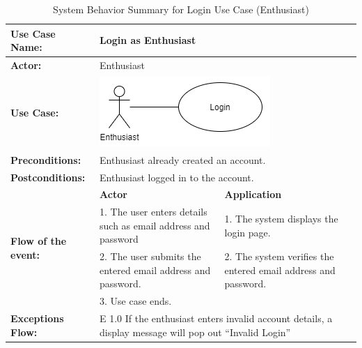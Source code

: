 \begin{longtable}{|p{3cm}|p{5cm}|p{5cm}|}
    \caption{\centering System Behavior Summary for Login Use Case (Enthusiast)} \\
    \hline
    \textbf{Use Case Name:} & \multicolumn{2}{l|}{Login as Enthusiast} \\ \hline
    \textbf{Actor:} & \multicolumn{2}{l|}{Enthusiast} \\ \hline
    \textbf{Use Case:} & \multicolumn{2}{l|}{\includegraphics[width=0.5\linewidth]{mainmatter/images/sucd8.png}} \\ \hline
    \textbf{Preconditions:} & \multicolumn{2}{p{10cm}|}{Enthusiast already created an account.} \\ \hline
    \textbf{Postconditions:} & \multicolumn{2}{p{10cm}|}{Enthusiast logged in to the account.} \\ \hline
    \multirow{4}{3cm}{\raggedright \textbf{Flow of the event:}} & \textbf{Actor} & \textbf{Application} \\ \cline{2-3}
    & 1. The user enters details such as email address and password & 1. The system displays the login page. \\ \cline{2-3}
    & 2. The user submits the entered email address and password. & 2. The system verifies the entered email address and password. \\ \cline{2-3}
    & 3. Use case ends. & \\ \hline
    \multirow{1}{3cm}{\raggedright \textbf{Exceptions Flow:}} 
    & \multicolumn{2}{p{10cm}|}{\raggedright E 1.0 If the enthusiast enters invalid account details, a display message will pop out “Invalid Login”} \\ \hline
\end{longtable}
\pagebreak

